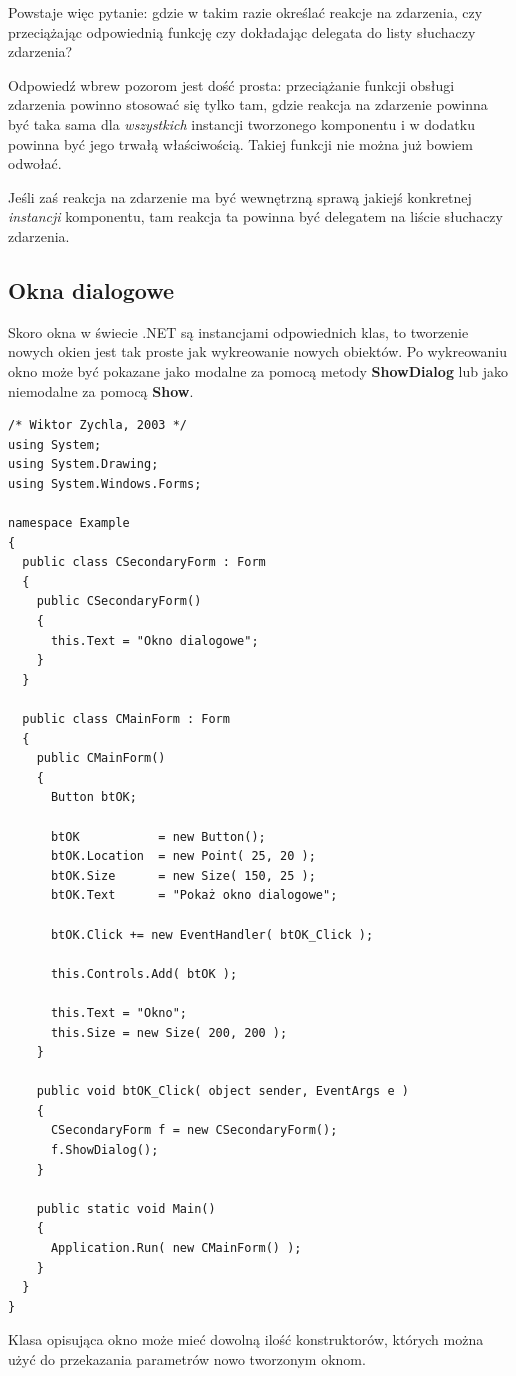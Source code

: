 Powstaje więc pytanie: gdzie w takim razie określać reakcje na zdarzenia, czy przeciążając odpowiednią 
funkcję czy dokładając delegata do listy słuchaczy zdarzenia?

Odpowiedź wbrew pozorom jest dość prosta: przeciążanie funkcji obsługi zdarzenia powinno stosować się tylko
tam, gdzie reakcja na zdarzenie powinna być taka sama dla {\em wszystkich} instancji tworzonego komponentu i 
w dodatku powinna być jego trwałą właściwością. Takiej funkcji nie można już bowiem odwołać. 

Jeśli zaś reakcja na zdarzenie ma być wewnętrzną sprawą jakiejś konkretnej {\em instancji} komponentu, tam
reakcja ta powinna być delegatem na liście słuchaczy zdarzenia.

\subsection{Okna dialogowe}

Skoro okna w świecie .NET są instancjami odpowiednich klas, to tworzenie nowych okien jest tak proste
jak wykreowanie nowych obiektów. Po wykreowaniu okno może być pokazane jako modalne za pomocą metody
{\bf ShowDialog} lub jako niemodalne za pomocą {\bf Show}.

\begin{scriptsize}
\begin{verbatim}
/* Wiktor Zychla, 2003 */
using System;
using System.Drawing;
using System.Windows.Forms;

namespace Example
{
  public class CSecondaryForm : Form
  {
    public CSecondaryForm()
    {
      this.Text = "Okno dialogowe";
    }
  }

  public class CMainForm : Form
  {   
    public CMainForm()
    {
      Button btOK;       

      btOK           = new Button();     
      btOK.Location  = new Point( 25, 20 );
      btOK.Size      = new Size( 150, 25 );
      btOK.Text      = "Pokaż okno dialogowe";

      btOK.Click += new EventHandler( btOK_Click );

      this.Controls.Add( btOK );

      this.Text = "Okno"; 
      this.Size = new Size( 200, 200 );
    }

    public void btOK_Click( object sender, EventArgs e )
    {
      CSecondaryForm f = new CSecondaryForm();
      f.ShowDialog(); 
    }

    public static void Main()
    {
      Application.Run( new CMainForm() );
    }
  }
}
\end{verbatim}
\end{scriptsize}

Klasa opisująca okno może mieć dowolną ilość konstruktorów, których można użyć do przekazania
parametrów nowo tworzonym oknom.

